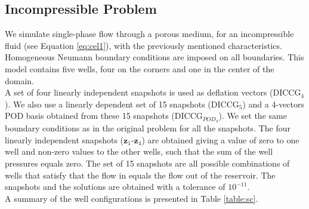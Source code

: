\documentclass[review]{elsarticle}
\begin{document}
\subsection{Incompressible Problem}

We simulate single-phase flow through a porous medium, for an incompressible fluid (see Equation \eqref{eq:cel1}), with the previously mentioned characteristics. Homogeneous Neumann boundary conditions are imposed on all boundaries. This model contains five wells, four on the corners and one in the center of the domain. \\
A set of four linearly independent snapshots is used as deflation vectors (DICCG$_4$). We also use a linearly dependent set of 15 snapshots (DICCG$_5$) and a 4-vectors POD basis obtained from these 15 snapshots (DICCG$_{POD_4}$). We set the same boundary conditions as in the original problem for all the snapshots.
The four linearly independent snapshots ($\mathbf{z}_1$-$\mathbf{z}_4$) are obtained giving a value of zero to one well and non-zero values to the other wells, such that the sum of the well pressures equals zero. The set of 15 snapshots are all possible combinations of wells that satisfy that the flow in equals the flow out of the reservoir. The snapshots and the solutions are obtained with a tolerance of $10^{-11}$. \\
A summary of the well configurations is presented in Table \ref{table:sc}.
\renewcommand{\arraystretch}{1}
\end{document}

